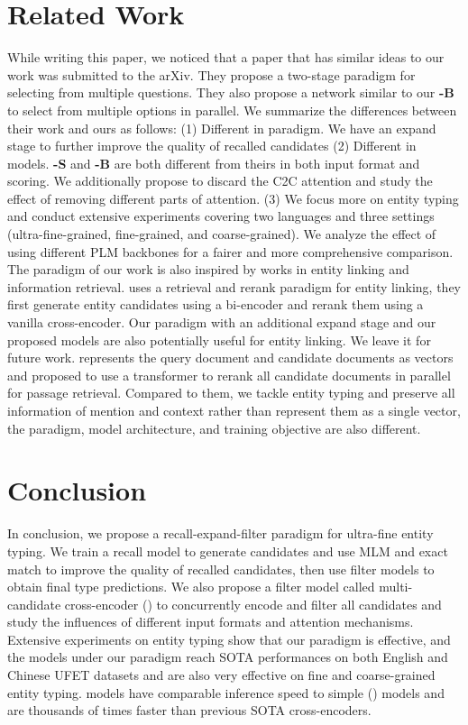 \documentclass[11pt]{article}
\begin{document}
 \section{Related Work}
While writing this paper, we noticed that a paper \cite{Du2022LearningTS} that has similar ideas to our work was submitted to the arXiv. They propose a two-stage paradigm for selecting from multiple questions. They also propose a network similar to our {\bf \textsc{\name-B}} to select from multiple options in parallel. We summarize the differences between their work and ours as follows: (1) Different in paradigm. We have an expand stage to further improve the quality of recalled candidates (2) Different in models. {\bf \textsc{\name-S}} and {\bf \textsc{\name-B}} are both different from theirs in both input format and scoring. We additionally propose to discard the C2C attention and study the effect of removing different parts of attention. (3) We focus more on entity typing and conduct extensive experiments covering two languages and three settings (ultra-fine-grained, fine-grained, and coarse-grained). We analyze the effect of using different PLM backbones for a fairer and more comprehensive comparison.
The paradigm of our work is also inspired by works in entity linking and information retrieval. \citet{wu2019zero} uses a retrieval and rerank paradigm for entity linking, they first generate entity candidates using a bi-encoder and rerank them using a vanilla cross-encoder. Our paradigm with an additional expand stage and our proposed {\bf \textsc{\name}} models are also potentially useful for entity linking. We leave it for future work. \citet{halter} represents the query document and candidate documents as vectors and proposed to use a transformer to rerank all candidate documents in parallel for passage retrieval. Compared to them, we tackle entity typing and preserve all information of mention and context rather than represent them as a single vector, the paradigm, model architecture, and training objective are also different.



 \section{Conclusion}
In conclusion, we propose a recall-expand-filter paradigm for ultra-fine entity typing. We train a recall model to generate candidates and use MLM and exact match to improve the quality of recalled candidates, then use filter models to obtain final type predictions. We also propose a filter model called multi-candidate cross-encoder ({\bf \textsc{\name}}) to concurrently encode and filter all candidates and study the influences of different input formats and attention mechanisms. Extensive experiments on entity typing show that our paradigm is effective, and the {\bf \textsc{\name}} models under our paradigm reach SOTA performances on both English and Chinese UFET datasets and are also very effective on fine and coarse-grained entity typing.  {\bf \textsc{\name}} models have comparable inference speed to simple ({\bf \textsc{\name}})  models and are thousands of times faster than previous SOTA cross-encoders. 


\end{document}

